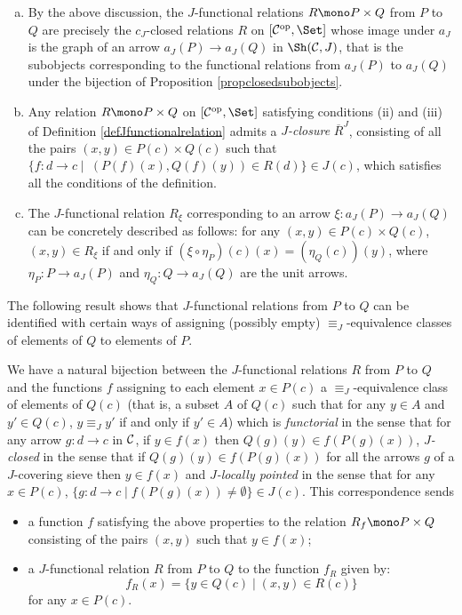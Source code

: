 \documentclass[a4paper,12pt]{article}
\begin{document}
\begin{remarks}\label{remfunctionalrelations}
	\begin{enumerate}[(a)]
		\item By the above discussion, the $J$-functional relations $R\mono P\times Q$ from $P$ to $Q$ are precisely the $c_{J}$-closed relations $R$ on $[{\cal C}^{\textup{op}}, \Set]$ whose image under $a_{J}$ is the graph of an arrow $a_{J}(P)\to a_{J}(Q)$ in $\Sh({\cal C}, J)$, that is the subobjects corresponding to the functional relations from $a_{J}(P)$ to $a_{J}(Q)$ under the bijection of Proposition \ref{propclosedsubobjects}.
		
		\item Any relation $R\mono P\times Q$ on $[{\cal C}^{\textup{op}}, \Set]$ satisfying conditions (ii) and (iii) of Definition \ref{defJfunctionalrelation} admits a \emph{$J$-closure} $\overline{R}^{J}$, consisting of all the pairs $(x, y)\in P(c)\times Q(c)$ such that $\{f:d\to c \mid\ (P(f)(x), Q(f)(y))\in R(d)\}\in J(c)$, which satisfies all the conditions of the definition. 
		
		\item The $J$-functional relation $R_{\xi}$ corresponding to an arrow $\xi:a_{J}(P)\to a_{J}(Q)$ can be concretely described as follows: for any $(x,y)\in P(c)\times Q(c)$, $(x, y)\in R_{\xi}$ if and only if $(\xi\circ \eta_{P})(c)(x)=(\eta_{Q}(c))(y)$, where $\eta_{P}:P\to a_{J}(P)$ and $\eta_{Q}:Q\to a_{J}(Q)$ are the unit arrows.			
	\end{enumerate}
\end{remarks} 

The following result shows that $J$-functional relations from $P$ to $Q$ can be identified with certain ways of assigning (possibly empty) $\equiv_{J}$-equivalence classes of elements of $Q$ to elements of $P$.

\begin{proposition}\label{propfuncionalassignment}
	We have a natural bijection between the $J$-functional relations $R$ from $P$ to $Q$ and the functions $f$ assigning to each element $x\in P(c)$ a $\equiv_{J}$-equivalence class of elements of $Q(c)$ (that is, a subset $A$ of $Q(c)$ such that for any $y\in A$ and $y'\in Q(c)$, $y\equiv_{J} y'$ if and only if $y'\in A$) which is \emph{functorial} in the sense that for any arrow $g:d\to c$ in $\cal C$, if $y\in f(x)$ then $Q(g)(y)\in f(P(g)(x))$, \emph{$J$-closed} in the sense that if $Q(g)(y)\in f(P(g)(x))$ for all the arrows $g$ of a $J$-covering sieve then $y\in f(x)$ and \emph{$J$-locally pointed} in the sense that for any $x\in P(c)$, $\{g:d\to c \mid f(P(g)(x))\neq \emptyset \}\in J(c)$. This correspondence sends 
	\begin{itemize}
		\item a function $f$ satisfying the above properties to the relation $R_{f}\mono P\times Q$ consisting of the pairs $(x, y)$ such that $y\in f(x)$;
		
		\item a $J$-functional relation $R$ from $P$ to $Q$ to the function $f_{R}$ given by:
		\[
		f_{R}(x)=\{y\in Q(c) \mid (x, y)\in R(c)\}
		\]
		for any $x\in P(c)$.
	\end{itemize}
\end{proposition}
\end{document}
